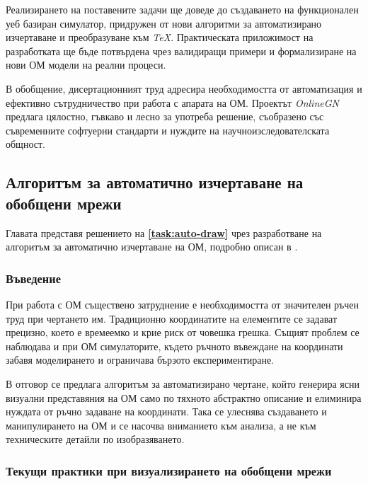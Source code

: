 Реализирането на поставените задачи ще доведе до създаването на функционален уеб базиран симулатор, придружен от нови алгоритми за автоматизирано изчертаване и преобразуване към \textit{TeX}. Практическата приложимост на разработката ще бъде потвърдена чрез валидиращи примери и формализиране на нови ОМ модели на реални процеси.

\vspace{0.5cm}

В обобщение, дисертационният труд адресира необходимостта от автоматизация и ефективно сътрудничество при работа с апарата на ОМ. Проектът \textit{OnlineGN} предлага цялостно, гъвкаво и лесно за употреба решение, съобразено със съвременните софтуерни стандарти и нуждите на научноизследователската общност.



\subsection{Алгоритъм за автоматично изчертаване на обобщени мрежи}
\label{sec:auto-drawing}

\hspace*{2.5em}Главата представя решението на \textbf{\ref{task:auto-draw}} чрез разработване на алгоритъм за автоматично изчертаване на ОМ, подробно описан в \cite{DIS-DimitrievTerziev}.

\subsubsection{Въведение}
\hspace*{2.5em}При работа с ОМ съществено затруднение е необходимостта от значителен ръчен труд при чертането им. Традиционно координатите на елементите се задават прецизно, което е времеемко и крие риск от човешка грешка. Същият проблем се наблюдава и при ОМ симулаторите, където ръчното въвеждане на координати забавя моделирането и ограничава бързото експериментиране.

В отговор се предлага алгоритъм за автоматизирано чертане, който генерира ясни визуални представяния на ОМ само по тяхното абстрактно описание и елиминира нуждата от ръчно задаване на координати. Така се улеснява създаването и манипулирането на ОМ и се насочва вниманието към анализа, а не към техническите детайли по изобразяването.

\subsubsection{Текущи практики при визуализирането на обобщени мрежи}

